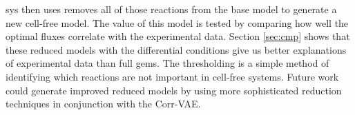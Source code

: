 \gls{sys} then uses removes all of those reactions from the base model to generate a new cell-free model.
The value of this model is tested by comparing how well the optimal fluxes correlate with the experimental data.
Section \ref{sec:cmp} shows that these reduced models with the differential conditions give us better explanations of experimental data than full \glspl{gem}.
The thresholding is a simple method of identifying which reactions are not important in cell-free systems.
Future work could generate improved reduced models by using more sophisticated reduction techniques in conjunction with the Corr-VAE.